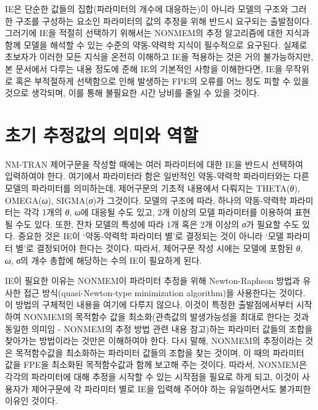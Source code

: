 \documentclass[
  11pt,
  krantz2,
  a4paper]{krantz}
\theoremstyle{definition}
\theoremstyle{definition}
\theoremstyle{definition}
\theoremstyle{remark}
\begin{document}
IE은 단순한 값들의 집합(파라미터의 개수에 대응하는)이 아니라 모델의 구조와 그러한 구조를 구성하는 요소인 파라미터의 값의 추정을 위해 반드시 요구되는 출발점이다. 그러기에 IE을 적절히 선택하기 위해서는 NONMEM의 추정 알고리즘에 대한 지식과 함께 모델을 해석할 수 있는 수준의 약동-약력학 지식이 필수적으로 요구된다. 실제로 초보자가 이러한 모든 지식을 온전히 이해하고 IE을 적용하는 것은 거의 불가능하지만, 본 문서에서 다루는 내용 정도에 준해 IE의 기본적인 사항을 이해한다면, IE을 무작위로 혹은 부적절하게 선택함으로 인해 발생하는 FPE의 오류를 어느 정도 피할 수 있을 것으로 생각되며, 이를 통해 불필요한 시간 낭비를 줄일 수 있을 것이다.

\hypertarget{IE-role}{%
\section{초기 추정값의 의미와 역할}\label{IE-role}}

NM-TRAN 제어구문을 작성할 때에는 여러 파라미터에 대한 IE을 반드시 선택하여 입력하여야 한다. 여기에서 파라미터라 함은 일반적인 약동-약력학 파라미터와는 다른 모델의 파라미터를 의미하는데, 제어구문의 기초적 내용에서 다뤄지는 THETA(\emph{θ}), OMEGA(\emph{ω}), SIGMA(\emph{σ})가 그것이다. 모델의 구조에 따라, 하나의 약동-약력학 파라미터는 각각 1개의 \emph{θ}, \emph{ω}에 대응될 수도 있고, 2개 이상의 모델 파라미터를 이용하여 표현될 수도 있다. 또한, 잔차 모델의 특성에 따라 1개 혹은 2개 이상의 \emph{σ}가 필요할 수도 있다. 중요한 것은 IE이 `약동-약력학 파라미터 별'로 결정되는 것이 아니라 `모델 파라미터 별'로 결정되어야 한다는 것이다. 따라서, 제어구문 작성 시에는 모델에 포함된 \emph{θ}, \emph{ω}, \emph{σ}의 개수 총합에 해당하는 수의 IE이 필요하게 된다.

IE이 필요한 이유는 NONMEM이 파라미터 추정을 위해 Newton-Raphson 방법과 유사한 접근 방식(quasi-Newton-type minimization algorithm)을 사용한다는 것이다. 이 방법의 구체적인 내용을 여기에 다루지 않으나, 이것이 특정한 출발점에서부터 시작하여 NONMEM의 목적함수 값을 최소화(관측값의 발생가능성을 최대로 한다는 것과 동일한 의미임 - NONMEM의 추정 방법 관련 내용 참고)하는 파라미터 값들의 조합을 찾아가는 방법이라는 것만은 이해하여야 한다. 다시 말해, NONMEM의 추정이라는 것은 목적함수값을 최소화하는 파라미터 값들의 조합을 찾는 것이며, 이 때의 파라미터 값을 FPE을 최소화된 목적함수값과 함께 보고해 주는 것이다. 따라서, NONMEM은 각각의 파라미터에 대해 추정을 시작할 수 있는 시작점을 필요로 하게 되고, 이것이 사용자가 제어구문에 각 파라미터 별로 IE을 입력해 주어야 하는 유일하면서도 불가피한 이유인 것이다.
\end{document}
